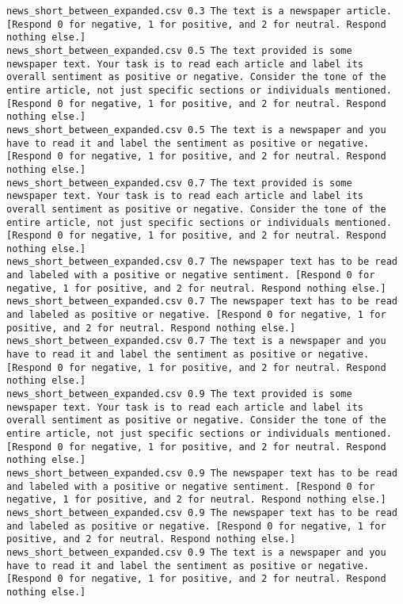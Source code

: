 \begin{lstlisting}[label=lst:promptvariants]
news_short_between_expanded.csv	0.3	The text is a newspaper article. [Respond 0 for negative, 1 for positive, and 2 for neutral. Respond nothing else.]
news_short_between_expanded.csv	0.5	The text provided is some newspaper text. Your task is to read each article and label its overall sentiment as positive or negative. Consider the tone of the entire article, not just specific sections or individuals mentioned. [Respond 0 for negative, 1 for positive, and 2 for neutral. Respond nothing else.]
news_short_between_expanded.csv	0.5	The text is a newspaper and you have to read it and label the sentiment as positive or negative. [Respond 0 for negative, 1 for positive, and 2 for neutral. Respond nothing else.]
news_short_between_expanded.csv	0.7	The text provided is some newspaper text. Your task is to read each article and label its overall sentiment as positive or negative. Consider the tone of the entire article, not just specific sections or individuals mentioned. [Respond 0 for negative, 1 for positive, and 2 for neutral. Respond nothing else.]
news_short_between_expanded.csv	0.7	The newspaper text has to be read and labeled with a positive or negative sentiment. [Respond 0 for negative, 1 for positive, and 2 for neutral. Respond nothing else.]
news_short_between_expanded.csv	0.7	The newspaper text has to be read and labeled as positive or negative. [Respond 0 for negative, 1 for positive, and 2 for neutral. Respond nothing else.]
news_short_between_expanded.csv	0.7	The text is a newspaper and you have to read it and label the sentiment as positive or negative. [Respond 0 for negative, 1 for positive, and 2 for neutral. Respond nothing else.]
news_short_between_expanded.csv	0.9	The text provided is some newspaper text. Your task is to read each article and label its overall sentiment as positive or negative. Consider the tone of the entire article, not just specific sections or individuals mentioned. [Respond 0 for negative, 1 for positive, and 2 for neutral. Respond nothing else.]
news_short_between_expanded.csv	0.9	The newspaper text has to be read and labeled with a positive or negative sentiment. [Respond 0 for negative, 1 for positive, and 2 for neutral. Respond nothing else.]
news_short_between_expanded.csv	0.9	The newspaper text has to be read and labeled as positive or negative. [Respond 0 for negative, 1 for positive, and 2 for neutral. Respond nothing else.]
news_short_between_expanded.csv	0.9	The text is a newspaper and you have to read it and label the sentiment as positive or negative. [Respond 0 for negative, 1 for positive, and 2 for neutral. Respond nothing else.]

\end{lstlisting}
